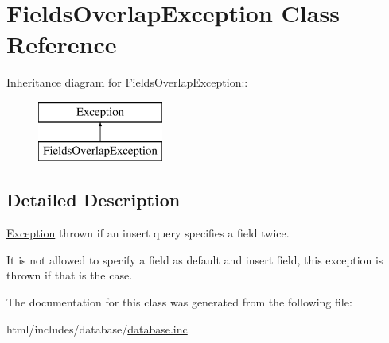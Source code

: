 \hypertarget{classFieldsOverlapException}{
\section{FieldsOverlapException Class Reference}
\label{classFieldsOverlapException}
}
Inheritance diagram for FieldsOverlapException::\begin{figure}[H]
\begin{center}
\leavevmode
\includegraphics[height=2cm]{classFieldsOverlapException}
\end{center}
\end{figure}


\subsection{Detailed Description}
\hyperlink{classException}{Exception} thrown if an insert query specifies a field twice.

It is not allowed to specify a field as default and insert field, this exception is thrown if that is the case. 

The documentation for this class was generated from the following file:\begin{DoxyCompactItemize}
\item 
html/includes/database/\hyperlink{database_8inc}{database.inc}\end{DoxyCompactItemize}
